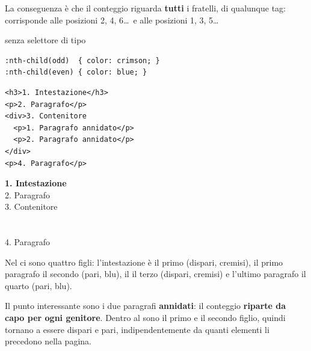 La conseguenza è che il conteggio riguarda \textbf{tutti} i fratelli, di
qualunque tag:  corrisponde alle posizioni 2, 4, 6\ldots\ e
 alle posizioni 1, 3, 5\ldots

\begin{esempio}{ senza selettore di tipo}
\begin{affianco}[0.55]
\begin{lstlisting}[style=css, name=senza-tipo.css]
:nth-child(odd)  { color: crimson; }
:nth-child(even) { color: blue; }
\end{lstlisting}
\begin{lstlisting}[style=html, name=senza-tipo.html]
<h3>1. Intestazione</h3>
<p>2. Paragrafo</p>
<div>3. Contenitore
  <p>1. Paragrafo annidato</p>
  <p>2. Paragrafo annidato</p>
</div>
<p>4. Paragrafo</p>
\end{lstlisting}
\risultato
\begin{browser}
  {\Lora\bfseries\large\color{css-crimson}1. Intestazione}\\[5pt]
  {\color{css-blue}2. Paragrafo}\\[5pt]
  {\color{css-crimson}3. Contenitore}\\[3pt]
  \\[3pt]
  \\[5pt]
  {\color{css-blue}4. Paragrafo}
\end{browser}
\end{affianco}

Nel  ci sono quattro figli: l'intestazione è il primo (dispari,
cremisi), il primo paragrafo il secondo (pari, blu), il  il terzo
(dispari, cremisi) e l'ultimo paragrafo il quarto (pari, blu).

Il punto interessante sono i due paragrafi \textbf{annidati}: il conteggio
\textbf{riparte da capo per ogni genitore}. Dentro al  sono il primo e
il secondo figlio, quindi tornano a essere dispari e pari, indipendentemente da
quanti elementi li precedono nella pagina.
\end{esempio}


